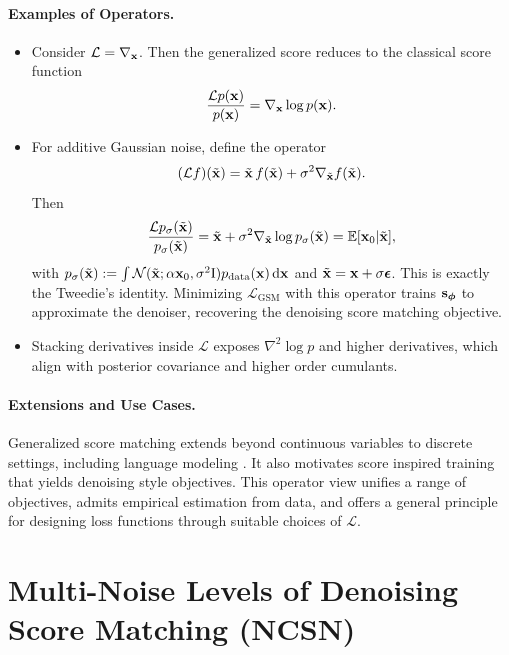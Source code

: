 \paragraph{Examples of Operators.}
\begin{itemize}
\item {} Consider $\mathcal L = \nabla_{{\mathbf{x}}}$. 
Then the generalized score reduces to the classical score function
\[
\frac{\mathcal L p({\mathbf{x}})}{p({\mathbf{x}})}
= \nabla_{{\mathbf{x}}}\log p({\mathbf{x}}).
\]
\item {}
For additive Gaussian noise, define the operator
\[
(\mathcal L f)(\tilde{{\mathbf{x}}})
= \tilde{{\mathbf{x}}}\,f(\tilde{{\mathbf{x}}}) + \sigma^2\nabla_{\tilde{{\mathbf{x}}}} f(\tilde{{\mathbf{x}}}).
\]
Then
\[
\frac{\mathcal L p_\sigma(\tilde{{\mathbf{x}}})}{p_\sigma(\tilde{{\mathbf{x}}})}
= \tilde{{\mathbf{x}}} + \sigma^2\nabla_{\tilde{{\mathbf{x}}}}\log p_\sigma(\tilde{{\mathbf{x}}})
= \mathbb E[{\mathbf{x}}_0|\tilde{{\mathbf{x}}}],
\]
with $p_\sigma(\tilde{{\mathbf{x}}}):= \int \mathcal{N}(\tilde{{\mathbf{x}}};\alpha {\mathbf{x}}_0,\sigma^2\mathrm{I})p_{\mathrm{data}}({\mathbf{x}})\mathop{}\!\mathrm{d}{\mathbf{x}}$ and $\tilde{{\mathbf{x}}}={\mathbf{x}}+\sigma{\bm{\epsilon}}$. This is exactly the Tweedie’s identity. 
Minimizing $\mathcal L_{\text{GSM}}$ with this operator trains ${\mathbf{s}}_{\bm{\phi}}$ to approximate the denoiser, recovering the denoising score matching objective.


\item {}
Stacking derivatives inside $\mathcal L$ exposes $\nabla^2\log p$ and higher derivatives, which align with posterior covariance and higher order cumulants.
\end{itemize}


\paragraph{Extensions and Use Cases.}
Generalized score matching extends beyond continuous variables to discrete settings, including language modeling \citep{meng2022concrete,lou2024discrete}. It also motivates score inspired training that yields denoising style objectives. This operator view unifies a range of objectives, admits empirical estimation from data, and offers a general principle for designing loss functions through suitable choices of $\mathcal L$.





\clearpage
\newpage


\section{\texorpdfstring{Multi-Noise Levels of Denoising Score Matching (NCSN)}{Multi-Noise Levels of Denoising Score Matching (NCSN)}}\label{sec:SMLD}

